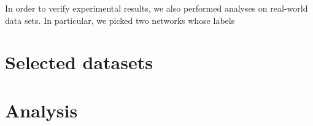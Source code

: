 In order to verify experimental results, we also performed analyses on real-world data sets. In
particular, we picked two networks whose labels 

\section{Selected datasets}

\section{Analysis}

